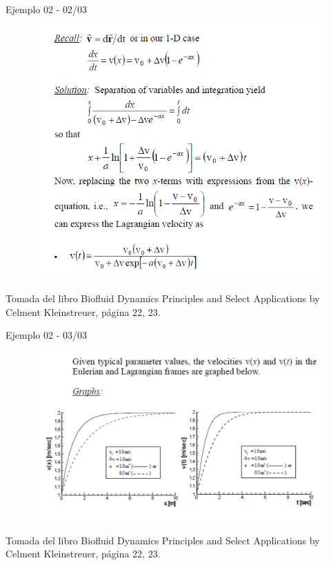 \begin{frame}{Ejemplo 02 - 02/03}
\justifying
\begin{figure}[H]
\centering
\includegraphics[scale=0.4]{Section_Files/picmanuel/17.png}
\label{fig: Figura2-Fig0403-12}
\end{figure}
{\tiny Tomada del libro Biofluid Dynamics Principles and Select Applications by Celment Kleinstreuer, página 22, 23.}
\end{frame}

\begin{frame}{Ejemplo 02 - 03/03}
\justifying
\begin{figure}[H]
\centering
\includegraphics[scale=0.5]{Section_Files/picmanuel/18.png}
\label{fig: Figura2-Fig0403-13}
\end{figure}
{\tiny Tomada del libro Biofluid Dynamics Principles and Select Applications by Celment Kleinstreuer, página 22, 23.}
\end{frame}


